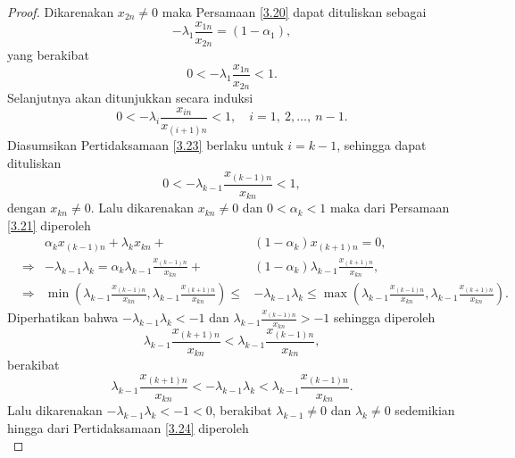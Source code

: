 \begin{proof}
    Dikarenakan $x_{2n} \neq 0$ maka Persamaan \eqref{3.20} dapat dituliskan sebagai
    \begin{equation*}
        -\lambda_1\frac{x_{1n}}{x_{2n}} = (1 - \alpha_1),
    \end{equation*}
    yang berakibat
    \begin{equation*}
        0 < -\lambda_1\frac{x_{1n}}{x_{2n}} < 1.
    \end{equation*}
    Selanjutnya akan ditunjukkan secara induksi
    \begin{equation}
        0 < -\lambda_i\frac{x_{in}}{x_{(i+1)n}} < 1, \quad i=1,~2,\dots,~n-1. \label{3.23}
    \end{equation}
    Diasumsikan Pertidaksamaan \eqref{3.23} berlaku untuk $i=k-1$, sehingga dapat dituliskan
    \begin{equation*}
        0 < -\lambda_{k-1}\frac{x_{(k-1)n}}{x_{kn}} < 1,
    \end{equation*}
    dengan $x_{kn} \neq 0$. Lalu dikarenakan $x_{kn} \neq 0$ dan $0<\alpha_k<1$ maka dari Persamaan \eqref{3.21} diperoleh
    \begin{align*}
         &&\alpha_kx_{(k-1)n} + \lambda_kx_{kn} +& (1 - \alpha_k)x_{(k+1)n} = 0, \\
         &\Longrightarrow&-\lambda_{k-1}\lambda_{k}=\alpha_k\lambda_{k-1}\frac{x_{(k-1)n}}{x_{kn}} +& (1 - \alpha_k)\lambda_{k-1}\frac{x_{(k+1)n}}{x_{kn}}, \\
         &\Longrightarrow&\min(\lambda_{k-1}\frac{x_{(k-1)n}}{x_{kn}},\lambda_{k-1}\frac{x_{(k+1)n}}{x_{kn}}) \leq & -\lambda_{k-1}\lambda_{k} \leq \max(\lambda_{k-1}\frac{x_{(k-1)n}}{x_{kn}},\lambda_{k-1}\frac{x_{(k+1)n}}{x_{kn}}).
    \end{align*}
    Diperhatikan bahwa $-\lambda_{k-1}\lambda_{k} < -1$ dan $\lambda_{k-1}\frac{x_{(k-1)n}}{x_{kn}} > -1$ sehingga diperoleh 
    \begin{equation*}
        \lambda_{k-1}\frac{x_{(k+1)n}}{x_{kn}} < \lambda_{k-1}\frac{x_{(k-1)n}}{x_{kn}},
    \end{equation*}
    berakibat
    \begin{equation}\label{3.24}
        \lambda_{k-1}\frac{x_{(k+1)n}}{x_{kn}} < -\lambda_{k-1}\lambda_{k} < \lambda_{k-1}\frac{x_{(k-1)n}}{x_{kn}}.
    \end{equation}
    Lalu dikarenakan $-\lambda_{k-1}\lambda_{k} < -1 < 0$, berakibat $\lambda_{k-1} \neq 0$ dan $\lambda_{k} \neq 0$ sedemikian hingga dari Pertidaksamaan \eqref{3.24} diperoleh
    \begin{equation*}

\end{equation*}
\end{proof}
